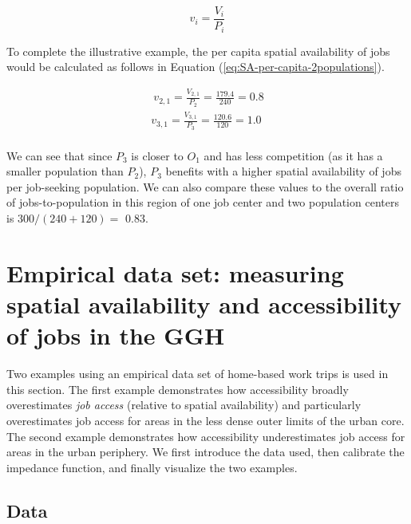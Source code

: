 \documentclass[]{elsarticle} %
\begin{document}
\begin{equation}
\label{eq:SA-per-capita}
v_i = \frac{V_i}{P_i}
\end{equation}

To complete the illustrative example, the per capita spatial
availability of jobs would be calculated as follows in Equation
(\ref{eq:SA-per-capita-2populations}).

\begin{equation}
\label{eq:SA-per-capita-2populations}
\begin{array}{l}\
v_{2,1} = \frac{V_{2,1}}{P_2} =  \frac{179.4}{240} = 0.8\\
v_{3,1} =  \frac{V_{3,1}}{P_3} =  \frac{120.6}{120} = 1.0\\
\end{array}
\end{equation}

We can see that since \(P_3\) is closer to \(O_1\) and has less
competition (as it has a smaller population than \(P_2\)), \(P_3\)
benefits with a higher spatial availability of jobs per job-seeking
population. We can also compare these values to the overall ratio of
jobs-to-population in this region of one job center and two population
centers is \(300/(240 + 120)=\) 0.83.

\hypertarget{empirical-data-set-measuring-spatial-availability-and-accessibility-of-jobs-in-the-ggh}{%
\section{Empirical data set: measuring spatial availability and
accessibility of jobs in the
GGH}\label{empirical-data-set-measuring-spatial-availability-and-accessibility-of-jobs-in-the-ggh}}

Two examples using an empirical data set of home-based work trips is
used in this section. The first example demonstrates how accessibility
broadly overestimates \emph{job access} (relative to spatial
availability) and particularly overestimates job access for areas in the
less dense outer limits of the urban core. The second example
demonstrates how accessibility underestimates job access for areas in
the urban periphery. We first introduce the data used, then calibrate
the impedance function, and finally visualize the two examples.

\hypertarget{data}{%
\subsection{Data}\label{data}}
\end{document}
